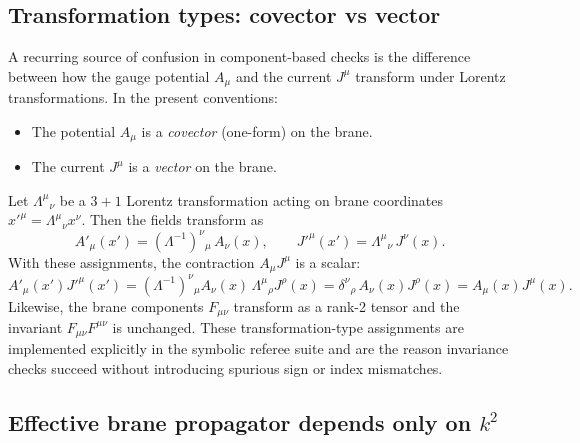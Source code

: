 \documentclass[11pt]{article}
\newcommand{\A}{A}
\newcommand{\F}{F}
\newcommand{\J}{J}
\begin{document}
\subsection{Transformation types: covector vs vector}
\label{sec:covector_vector}

A recurring source of confusion in component-based checks is the difference
between how the gauge potential \(\A_\mu\) and the current \(\J^\mu\) transform
under Lorentz transformations. In the present conventions:

\begin{itemize}
\item The potential \(\A_\mu\) is a \emph{covector} (one-form) on the brane.
\item The current \(\J^\mu\) is a \emph{vector} on the brane.
\end{itemize}

Let \(\Lambda^\mu{}_\nu\) be a \(3+1\) Lorentz transformation acting on brane
coordinates \(x'^\mu=\Lambda^\mu{}_\nu x^\nu\). Then the fields transform as
\begin{equation}
  \A'_\mu(x') = (\Lambda^{-1})^\nu{}_\mu \,\A_\nu(x),
  \qquad
  \J'^\mu(x') = \Lambda^\mu{}_\nu\,\J^\nu(x).
  \label{eq:lorentz_transform_types}
\end{equation}
With these assignments, the contraction \(\A_\mu \J^\mu\) is a scalar:
\begin{equation}
  \A'_\mu(x')\J'^\mu(x')
  =
  (\Lambda^{-1})^\nu{}_\mu \A_\nu(x)\,
  \Lambda^\mu{}_\rho \J^\rho(x)
  =
  \delta^\nu{}_\rho\,\A_\nu(x)\J^\rho(x)
  =
  \A_\mu(x)\J^\mu(x).
\end{equation}
Likewise, the brane components \(\F_{\mu\nu}\) transform as a rank-2 tensor and
the invariant \(\F_{\mu\nu}\F^{\mu\nu}\) is unchanged. These transformation-type
assignments are implemented explicitly in the symbolic referee suite and are the
reason invariance checks succeed without introducing spurious sign or index
mismatches.

\subsection{\texorpdfstring{Effective brane propagator depends only on \(k^2\)}{Effective brane propagator depends only on k squared}}
\label{sec:prop_k2}
\end{document}
